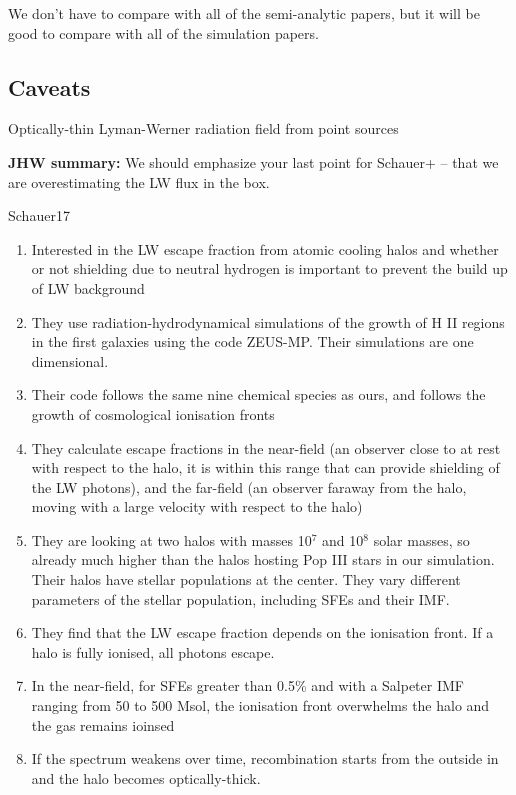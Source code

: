 \documentclass[a4paper,fleqn,usenatbib]{mnras}
\begin{document}
\li We don't have to compare with all of the semi-analytic papers, but
it will be good to compare with all of the simulation papers.

\subsection{Caveats}

\li Optically-thin Lyman-Werner radiation field from point sources \citep{Schauer17}

\noindent\textbf{JHW summary:} We should emphasize your last point for Schauer+ -- that we are overestimating the LW flux in the box.

\li Schauer17
\begin{enumerate}
	\item Interested in the LW escape fraction from atomic cooling halos and whether or not shielding due to neutral hydrogen is important to prevent the build up of LW background
	\item They use radiation-hydrodynamical simulations of the growth of H II regions in the first galaxies using the code ZEUS-MP. Their simulations are one dimensional. 
	\item Their code follows the same nine chemical species as ours, and follows the growth of cosmological ionisation fronts
	\item They calculate escape fractions in the near-field (an observer close to at rest with respect to the halo, it is within this range that \hh{} can provide shielding of the LW photons), and the far-field (an observer faraway from the halo, moving with a large velocity with respect to the halo)
	\item They are looking at two halos with masses 10$^{7}$ and 10$^{8}$ solar masses, so already much higher than the halos hosting Pop III stars in our simulation. Their halos have stellar populations at the center. They vary different parameters of the stellar population, including SFEs and their IMF.
	\item They find that the LW escape fraction depends on the ionisation front. If a halo is fully ionised, all photons escape.
	\item In the near-field, for SFEs greater than 0.5\% and with a Salpeter IMF ranging from 50 to 500 Msol, the ionisation front overwhelms the halo and the gas remains ioinsed
	\item If the spectrum weakens over time, recombination starts from the outside in and the halo becomes optically-thick.

\end{enumerate}
\end{document}
